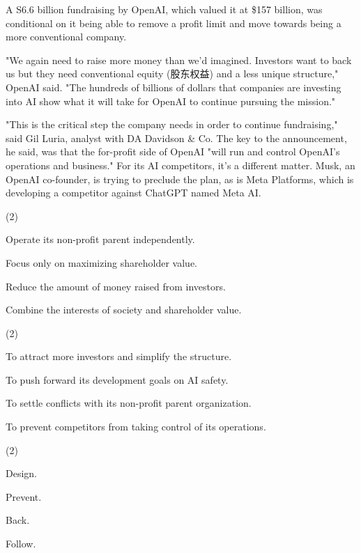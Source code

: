 \documentclass{英语试卷}
\begin{document}
\par A S6.6 billion fundraising by OpenAI, which valued it at \$157 billion, was conditional on it being able to remove a profit limit and move towards being a more conventional company.\par
\par "We again need to raise more money than we’d imagined. Investors want to back us but they need conventional equity (股东权益) and a less unique structure," OpenAI said. "The hundreds of billions of dollars that companies are investing into AI show what it will take for OpenAI to continue pursuing the mission."\par
\par "This is the critical step the company needs in order to continue fundraising," said Gil Luria, analyst with DA Davidson \& Co. The key to the announcement, he said, was that the for-profit side of OpenAI "will run and control OpenAI's operations and business." For its AI competitors, it's a different matter. Musk, an OpenAI co-founder, is trying to preclude the plan, as is Meta Platforms, which is developing a competitor against ChatGPT named Meta AI.\par
{}
\begin{choices}(2)
  \item Operate its non-profit parent independently.
  \item Focus only on maximizing shareholder value.
  \item Reduce the amount of money raised from investors.
  \item Combine the interests of society and shareholder value.
\end{choices}
\begin{choices}(2)
  \item To attract more investors and simplify the structure.
  \item To push forward its development goals on AI safety.
  \item To settle conflicts with its non-profit parent organization.
  \item To prevent competitors from taking control of its operations.
\end{choices}
\begin{choices}(2)
  \item Design.
  \item Prevent.
  \item Back.
  \item Follow.
\end{choices}
\end{document}
